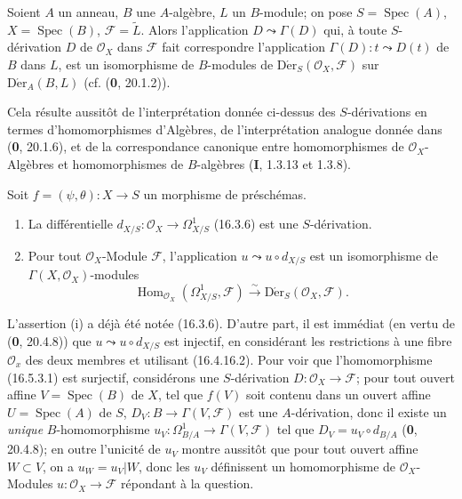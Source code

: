 \begin{proposition}[16.5.2]
\label{IV.16.5.2}
Soient $A$ un anneau, $B$ une $A$-algèbre, $L$ un $B$-module; on pose
$S=\operatorname{Spec}(A)$, $X=\operatorname{Spec}(B)$,
$\mathscr{F}=\widetilde{L}$. Alors l'application $D\leadsto\Gamma(D)$ qui, à
toute $S$-dérivation $D$ de $\mathcal{O}_X$ dans $\mathscr{F}$ fait
correspondre l'application $\Gamma(D):t\leadsto D(t)$ de $B$ dans $L$, est un
isomorphisme de $B$-modules de
$\operatorname{D\acute{e}r}_S(\mathcal{O}_X,\mathscr{F})$ sur
$\operatorname{D\acute{e}r}_A(B,L)$ \textup{(cf. (\textbf{0}, 20.1.2))}.
\end{proposition}

Cela résulte aussitôt de l'interprétation donnée ci-dessus des $S$-dérivations
en termes
d'homomorphismes d'Algèbres, de l'interprétation analogue donnée dans
(\textbf{0}, 20.1.6), et de la correspondance canonique entre homomorphismes de
$\mathcal{O}_X$-Algèbres et homomorphismes de $B$-algèbres (\textbf{I}, 1.3.13 et
1.3.8).

\begin{proposition}[16.5.3]
\label{IV.16.5.3}
Soit $f=(\psi,\theta):X\to S$ un morphisme de préschémas.
\begin{enumerate}
\item[\textup{(i)}] La différentielle
$d_{X/S}:\mathcal{O}_X\to\varOmega_{X/S}^1$ \textup{(16.3.6)} est une $S$-dérivation.
\item[\textup{(ii)}] Pour tout $\mathcal{O}_X$-Module $\mathscr{F}$, l'application
$u\leadsto u\circ d_{X/S}$ est un isomorphisme de
$\Gamma(X,\mathcal{O}_X)$-modules
\[
  \operatorname{Hom}_{\mathcal{O}_X}(\varOmega_{X/S}^1,\mathscr{F})
  \xrightarrow{\sim}
  \operatorname{D\acute{e}r}_S(\mathcal{O}_X,\mathscr{F}).
  \tag{16.5.3.1}
  \label{IV.16.5.3.1}
\]
\end{enumerate}
\end{proposition}

L'assertion (i) a déjà été notée (16.3.6). D'autre part, il est immédiat (en
vertu de (\textbf{0}, 20.4.8)) que $u\leadsto u\circ d_{X/S}$ est injectif, en
considérant les restrictions à une fibre $\mathcal{O}_x$ des deux membres et
utilisant (16.4.16.2). Pour voir que l'homomorphisme (16.5.3.1) est surjectif,
considérons une $S$-dérivation $D:\mathcal{O}_X\to\mathscr{F}$; pour tout
ouvert affine $V=\operatorname{Spec}(B)$ de $X$, tel que $f(V)$ soit contenu
dans un ouvert affine $U=\operatorname{Spec}(A)$ de $S$,
$D_V:B\to\Gamma(V,\mathscr{F})$ est une $A$-dérivation, donc il existe un
\emph{unique} $B$-homomorphisme
$u_V:\Omega_{B/A}^1\to\Gamma(V,\mathscr{F})$ tel que
$D_V=u_V\circ d_{B/A}$ (\textbf{0}, 20.4.8); en outre l'unicité de $u_V$ montre
aussitôt que pour tout ouvert affine $W\subset V$, on a $u_W=u_V|W$, donc les
$u_V$ définissent un homomorphisme de $\mathcal{O}_X$-Modules
$u:\mathcal{O}_X\to\mathscr{F}$ répondant à la question.

